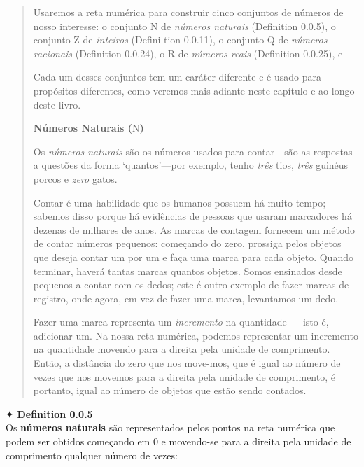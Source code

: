\documentclass[
]{article}
\begin{document}
\begin{quote}
Usaremos a reta numérica para construir cinco conjuntos de números de
nosso interesse: o conjunto N de \emph{números naturais} (Definition
0.0.5), o conjunto Z de \emph{inteiros} (Defini-tion 0.0.11), o conjunto
Q de \emph{números racionais} (Definition 0.0.24), o R de \emph{números
reais} (Definition 0.0.25), e

Cada um desses conjuntos tem um caráter diferente e é usado para
propósitos diferentes, como veremos mais adiante neste capítulo e ao
longo deste livro.

\textbf{Números Naturais (}N\textbf{)}

Os \emph{números naturais} são os números usados para contar---são as
respostas a questões da forma `quantos'---por exemplo, tenho \emph{três}
tios, \emph{três} guinéus porcos e \emph{zero} gatos.

Contar é uma habilidade que os humanos possuem há muito tempo; sabemos
disso porque há evidências de pessoas que usaram marcadores há dezenas
de milhares de anos. As marcas de contagem fornecem um método de contar
números pequenos: começando do zero, prossiga pelos objetos que deseja
contar um por um e faça uma marca para cada objeto. Quando terminar,
haverá tantas marcas quantos objetos. Somos ensinados desde pequenos a
contar com os dedos; este é outro exemplo de fazer marcas de registro,
onde agora, em vez de fazer uma marca, levantamos um dedo.

Fazer uma marca representa um \emph{incremento} na quantidade --- isto
é, adicionar um. Na nossa reta numérica, podemos representar um
incremento na quantidade movendo para a direita pela unidade de
comprimento. Então, a distância do zero que nos move-mos, que é igual ao
número de vezes que nos movemos para a direita pela unidade de
comprimento, é portanto, igual ao número de objetos que estão sendo
contados.
\end{quote}

✦ \textbf{Definition 0.0.5}\\
Os \textbf{números naturais} são representados pelos pontos na reta
numérica que podem ser obtidos começando em 0 e movendo-se para a
direita pela unidade de comprimento qualquer número de vezes:
\end{document}
